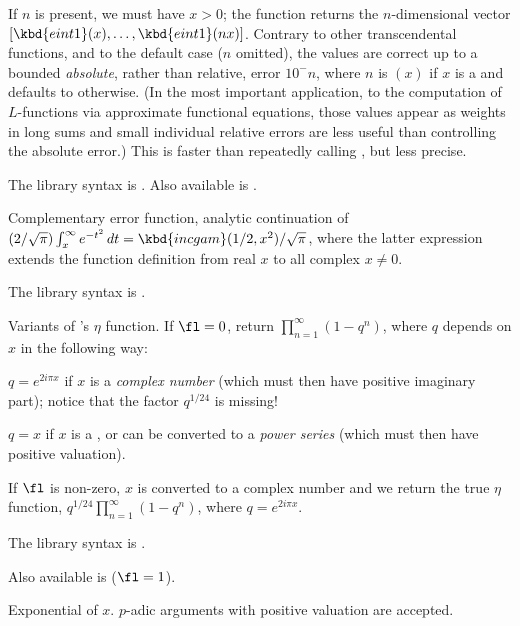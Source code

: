 If $n$ is present, we must have $x > 0$; the function returns the
$n$-dimensional vector $[\kbd{eint1}(x),\dots,\kbd{eint1}(nx)]$. Contrary to
other transcendental functions, and to the default case ($n$ omitted), the
values are correct up to a bounded \emph{absolute}, rather than relative,
error $10^-n$, where $n$ is $(x)$ if $x$ is a 
and defaults to  otherwise. (In the most important
application, to the computation of $L$-functions via approximate functional
equations, those values appear as weights in long sums and small individual
relative errors are less useful than controlling the absolute error.) This is
faster than repeatedly calling , but less precise.

The library syntax is .
Also available is .

\label{se:erfc}
Complementary error function, analytic continuation of
$(2/\sqrt\pi)\int_x^\infty e^{-t^2}\,dt = \kbd{incgam}(1/2,x^2)/\sqrt\pi$,
where the latter expression extends the function definition from real $x$ to
all complex $x \neq 0$.

The library syntax is .

\label{se:eta}
Variants of 's $\eta$ function.
If $\fl = 0$, return $\prod_{n=1}^\infty(1-q^n)$, where $q$ depends on $x$
in the following way:

\item $q = e^{2i\pi x}$ if $x$ is a \emph{complex number} (which must then
have positive imaginary part); notice that the factor $q^{1/24}$ is
missing!

\item $q = x$ if $x$ is a , or can be converted to a
\emph{power series} (which must then have positive valuation).

If $\fl$ is non-zero, $x$ is converted to a complex number and we return the
true $\eta$ function, $q^{1/24}\prod_{n=1}^\infty(1-q^n)$,
where $q = e^{2i\pi x}$.

The library syntax is .

Also available is  ($\fl=1$).

\label{se:exp}
Exponential of $x$.
$p$-adic arguments with positive valuation are accepted.

